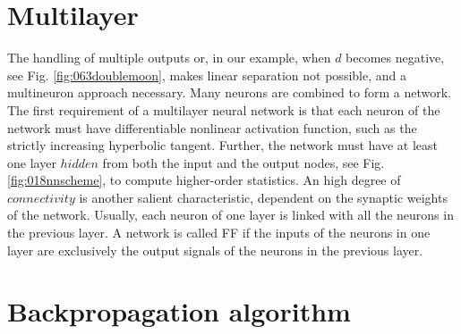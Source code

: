 \section{Multilayer}
\label{sec:multilayer}



The handling of multiple outputs or, in our example, 
when $d$ becomes negative, see Fig. \ref{fig:063doublemoon}, makes linear
separation not possible, and a multineuron approach necessary. 
Many neurons are combined to form a network.
The first requirement of a multilayer neural network
is that each neuron of the network must have differentiable nonlinear activation
function, such as the strictly increasing hyperbolic tangent.
Further, the network must have at least one layer $hidden$ from both the input
and the output nodes, see Fig. \ref{fig:018nnscheme}, to compute higher-order
statistics.
An high degree of $connectivity$ is another salient characteristic, dependent on
the synaptic weights of the network.
Usually, each neuron of one layer is linked with all the neurons in the previous
layer.
A network is called \acs{FF} if the inputs of the neurons in
one layer are exclusively the output signals of the neurons in the previous
layer.\\


\section{Backpropagation algorithm}
\label{sec:backpropagationalgorithm}

